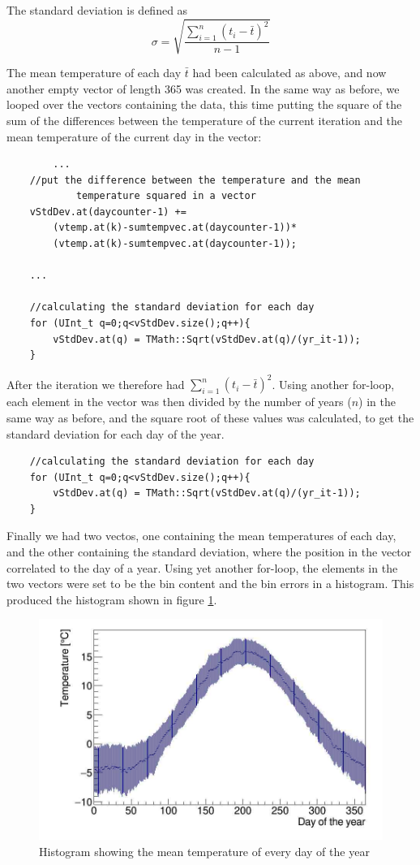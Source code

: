 \documentclass[a4paper,12pt,twoside]{article}
\begin{document}
 \bigskip
 The standard deviation is defined as 
  \begin{equation}
 \label{eq:StdDev}
 \sigma = \sqrt{\frac{\sum\limits_{i=1}^{n} (t_{i}-\bar{t})^2}{n-1}}
 \end{equation}
 
 The mean temperature of each day $\bar{t}$ had been calculated as above, and now another 
 empty vector of length 365 was created. In the same way as before, we looped over the vectors
 containing the data, this time putting the square of the sum of the differences between the
 temperature of the current iteration and the mean temperature of the current day in the vector:
 
 \begin{verbatim}
    	...
  	//put the difference between the temperature and the mean
  	        temperature squared in a vector
  	vStdDev.at(daycounter-1) +=
  	    (vtemp.at(k)-sumtempvec.at(daycounter-1))*
  	    (vtemp.at(k)-sumtempvec.at(daycounter-1));
  	
  	...
  	
  	//calculating the standard deviation for each day
	for (UInt_t q=0;q<vStdDev.size();q++){
		vStdDev.at(q) = TMath::Sqrt(vStdDev.at(q)/(yr_it-1));
	}
 \end{verbatim}

 
 After the iteration we therefore had ${\sum\limits_{i=1}^{n} (t_i - \bar{t})}^2$. Using another for-loop, each element in the vector
 was then divided by the number of years ($n$) in the same way as before, and the square root of these values was
 calculated, to get the standard deviation for each day of the year.
 
 \begin{verbatim}
  	//calculating the standard deviation for each day
	for (UInt_t q=0;q<vStdDev.size();q++){
		vStdDev.at(q) = TMath::Sqrt(vStdDev.at(q)/(yr_it-1));
	}
 \end{verbatim}
 Finally we had two vectos, one containing the mean temperatures of each day, and the other
 containing the standard deviation, where the position in the vector correlated to the day
 of a year. Using yet another for-loop, the elements in the two vectors were set to be the
 bin content and the bin errors in a histogram. This produced the histogram shown in
 figure \ref{fig:tempPerDay}.
 
 \begin{figure}[h]
  \begin{center}
   \includegraphics[width=15cm]{../Code/tempPerDay.jpg}
   \caption{Histogram showing the mean temperature of every day of the year}
   \label{fig:tempPerDay}
  \end{center}
 \end{figure}
 
 
\end{document}
